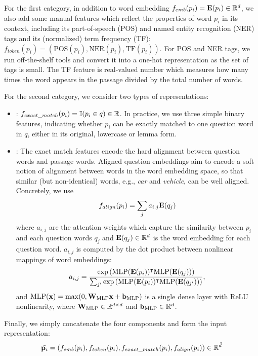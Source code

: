 For the first category, in addition to word embedding $f_{emb}(p_i) = \mathbf{E}(p_i) \in \mathbb{R}^d$, we also add some manual features which reflect the properties of word $p_i$ in its context, including its part-of-speech (POS) and named entity recognition (NER) tags and its (normalized) term frequency (TF): $f_{token}(p_i) = \left(\text{POS}(p_i), \text{NER}(p_i), \text{TF}(p_i)\right)$. For POS and NER tags, we run off-the-shelf tools and convert it into a one-hot representation as the set of tags is small. The TF feature is real-valued number which measures how many times the word appears in the passage divided by the total number of words.

For the second category, we consider two types of representations:
\begin{itemize}
  \item
  : $f_{exact\_match}(p_i) = \mathbb{I}(p_i \in q) \in \mathbb{R}$. In practice, we use three simple binary features, indicating whether $p_i$ can be exactly matched to one question word in $q$, either in its original, lowercase or lemma form.
  \item
  : The exact match features encode the hard alignment between question words and passage words. Aligned question embeddings aim to encode a soft notion of alignment between words in the word embedding space, so that similar (but non-identical) words, e.g., \textit{car} and \textit{vehicle}, can be well aligned. Concretely, we use
  \begin{equation}
      \label{eq:aligned_question}
    f_{align}(p_i) = \sum_j{a_{i, j} \mathbf{E}(q_j)}
  \end{equation}
  where $a_{i, j}$ are the attention weights which capture the similarity between $p_i$ and each question words $q_j$ and $\mathbf{E}(q_j) \in \mathbb{R}^d$ is the word embedding for each question word. $a_{i, j}$ is computed by the dot product between nonlinear mappings of word embeddings:
  \begin{equation}
    \label{eq:aligned_question_attention}
    a_{i, j} = \frac{\exp\left(\text{MLP}(\mathbf{E}(p_i))^{\intercal} \text{MLP}(\mathbf{E}(q_{j}))\right)}{\sum_{j'}{\exp\left(\text{MLP}(\mathbf{E}(p_i)) ^{\intercal} \text{MLP}(\mathbf{E}(q_{j'}))\right)}},
  \end{equation} and $\text{MLP}(\mathbf{x}) = \max(0, \mathbf{W}_{\text{MLP}}\mathbf{x} + \mathbf{b}_{\text{MLP}})$ is a single dense layer with ReLU nonlinearity, where $\mathbf{W}_{\text{MLP}} \in \mathbb{R}^{d \times d}$ and $\mathbf{b}_{\text{MLP}} \in \mathbb{R}^d$.
\end{itemize}
Finally, we simply concatenate the four components and form the input representation:
\begin{equation}
    \tilde{\mathbf{p}_i} = (f_{emb}(p_i), f_{token}(p_i), f_{exact\_match}(p_i), f_{align}(p_i)) \in \mathbb{R}^{\tilde{d}}
\end{equation}

